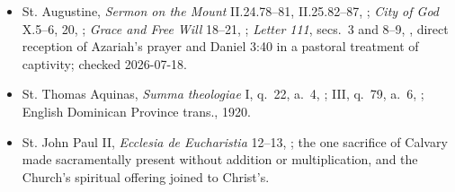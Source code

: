 \begin{deepstudy}
{\begin{itemize}[itemsep=0em,topsep=0.15em,parsep=0pt]
\item St. Augustine, \emph{Sermon on the Mount} II.24.78--81, II.25.82--87, ; \emph{City of God} X.5--6, 20, ; \emph{Grace and Free Will} 18--21, ; \emph{Letter 111}, secs.~3 and 8--9, , direct reception of Azariah's prayer and Daniel 3:40 in a pastoral treatment of captivity; checked 2026-07-18.
\item St. Thomas Aquinas, \emph{Summa theologiae} I, q.~22, a.~4, ; III, q.~79, a.~6, ; English Dominican Province trans., 1920.
\item St. John Paul II, \emph{Ecclesia de Eucharistia} 12--13, ; the one sacrifice of Calvary made sacramentally present without addition or multiplication, and the Church's spiritual offering joined to Christ's.
\end{itemize}
}


\end{deepstudy}
